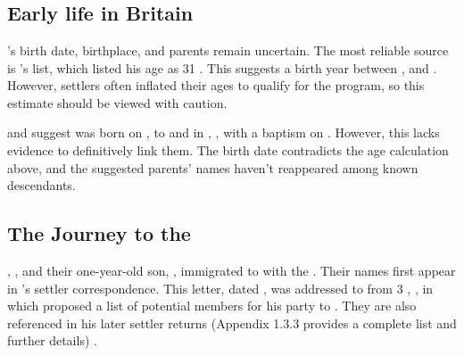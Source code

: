 \chapter[James McDonald]{\mcdonaldJName{}}
\label{ch1: James McDonald}


\section{Early life in Britain}

\mcdonaldJNameOnly{}'s birth date, birthplace, and parents remain uncertain. The most reliable source is \biggarASurname{}'s \settler{} list, which listed his age as 31 \autocite[536-539]{eggsa:biggarCorrespondance}. This suggests a birth year between , and . However, settlers often inflated their ages to qualify for the program, so this estimate should be viewed with caution.

\citeauthor{FS:JamesMcDonaldBaptism} and \citeauthor{settlers:JamesMcDonald} suggest \mcdonaldJName{} was born on , to \mcdonaldWWFullNames{} and \aitchisonJFullNames{} in \crawfordFull{}, \scotland{}, with a baptism on  \autocite{FS:JamesMcDonaldBaptism} \autocite{settlers:JamesMcDonald}. However, this lacks evidence to definitively link them. The birth date contradicts the age calculation above, and the suggested parents' names haven't reappeared among known descendants.

\section[The Journey to the Cape Colony]{The Journey to the \capeColony}
\label{ch1: Journey to the Cape Colony}

\mcdonaldJNameOnly{}, \welchMNameOnly{}, and their one-year-old son, \mcdonaldANameOnly{}, immigrated to \southAfrica{} with the \settlersBritish{} \autocite[46]{nash:1820}. Their names first appear in \biggarAName{}'s settler correspondence. This letter, dated , was addressed to \bathhurstHName{} from 3 \northumberlandCourtFull{}, \london{}, in which \biggarASurname{} proposed a list of potential members for his party to \southAfrica \autocite[536-539]{eggsa:biggarCorrespondance}. They are also referenced in his later settler returns (Appendix 1.3.3 provides a complete list and further details) \autocite{eggsa:biggarReturn}.

